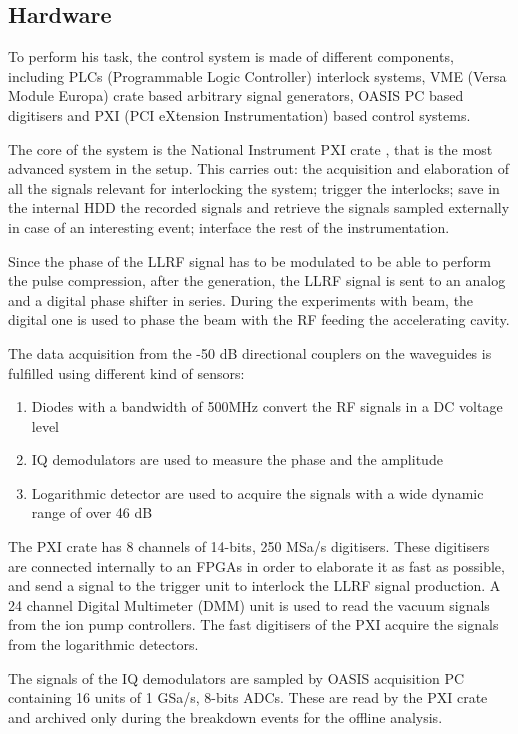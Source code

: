 \subsection[Hardware]{Hardware}

To perform his task, the control system is made of different components, including PLCs (Programmable Logic Controller) interlock systems,  VME (Versa Module Europa) crate based arbitrary signal generators, OASIS PC based digitisers and PXI (PCI eXtension Instrumentation) based control systems.

The core of the system is the National Instrument PXI crate \cite{NI:PXI}, that is the most advanced system in the setup. This carries out: the acquisition and elaboration of all the signals relevant for interlocking the system; trigger the interlocks; save in the internal HDD the recorded signals and retrieve the signals sampled externally in case of an interesting event; interface the rest of the instrumentation.


Since the phase of the LLRF signal has to be modulated to be able to perform the pulse compression, after the generation, the LLRF signal is sent to an analog and a digital phase shifter in series. During the experiments with beam, the digital one is used to phase the beam with the RF feeding the accelerating cavity.

The data acquisition from the -50 dB directional couplers on the waveguides is fulfilled using different kind of sensors:
\begin{enumerate}
\item Diodes with a bandwidth of 500MHz convert the RF signals in a DC voltage level
\item IQ demodulators are used to measure the phase and the amplitude
\item Logarithmic detector are used to acquire the signals with a wide dynamic range of over 46 dB
\end{enumerate}

The PXI crate has 8 channels of 14-bits, 250 MSa/s digitisers. These digitisers are connected internally to an FPGAs in order to elaborate it as fast as possible, and send a signal to the trigger unit to interlock the LLRF signal production. A 24 channel Digital Multimeter (DMM) unit is used to read the vacuum signals from the ion pump controllers. The fast digitisers of the PXI acquire the signals from the logarithmic detectors. 

The signals of the IQ demodulators are sampled by OASIS acquisition PC containing 16 units of 1 GSa/s, 8-bits ADCs. These are read by the PXI crate and archived only during the breakdown events for the offline analysis. 

